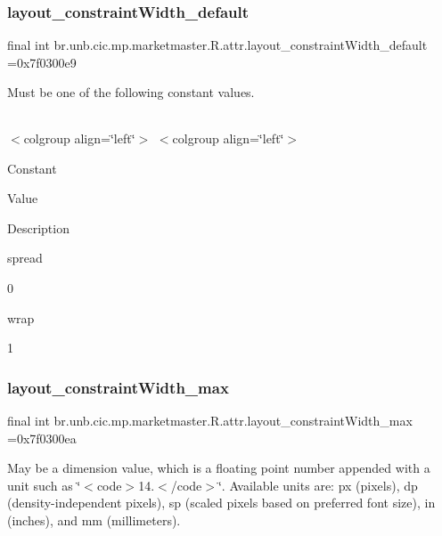 \subsubsection{\texorpdfstring{layout\+\_\+constraint\+Width\+\_\+default}{layout\_constraintWidth\_default}}
{\footnotesize\ttfamily final int br.\+unb.\+cic.\+mp.\+marketmaster.\+R.\+attr.\+layout\+\_\+constraint\+Width\+\_\+default =0x7f0300e9\hspace{0.3cm}{\ttfamily [static]}}

Must be one of the following constant values.

\tabulinesep=1mm
\begin{longtabu} spread 0pt [c]{*{0}{|X[-1]}|}
\hline
\end{longtabu}
$<$colgroup align=\char`\"{}left\char`\"{}$>$ $<$colgroup align=\char`\"{}left\char`\"{}$>$ 

Constant

Value

Description 

spread

0

wrap

1\mbox{\label{classbr_1_1unb_1_1cic_1_1mp_1_1marketmaster_1_1R_1_1attr_a1506e2750421829158d832725b7a9b26}} 
\subsubsection{\texorpdfstring{layout\+\_\+constraint\+Width\+\_\+max}{layout\_constraintWidth\_max}}
{\footnotesize\ttfamily final int br.\+unb.\+cic.\+mp.\+marketmaster.\+R.\+attr.\+layout\+\_\+constraint\+Width\+\_\+max =0x7f0300ea\hspace{0.3cm}{\ttfamily [static]}}

May be a dimension value, which is a floating point number appended with a unit such as \char`\"{}$<$code$>$14.\+5sp$<$/code$>$\char`\"{}. Available units are\+: px (pixels), dp (density-\/independent pixels), sp (scaled pixels based on preferred font size), in (inches), and mm (millimeters). \mbox{\label{classbr_1_1unb_1_1cic_1_1mp_1_1marketmaster_1_1R_1_1attr_a230f28b5e20ffd6a6d2fa868e9a48d07}} 
